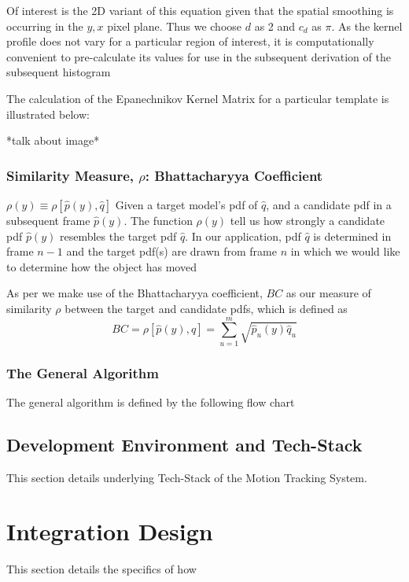 Of interest is the 2D variant of this equation given that the spatial smoothing
is occurring in the $y,x$ pixel plane. Thus we choose $d$ as 2 and $c_d$ as
$\pi$. As the kernel profile does not vary for a particular region of interest,
it is computationally convenient to pre-calculate its values for use in the subsequent derivation of the subsequent histogram

The calculation of the Epanechnikov Kernel Matrix for a particular template is
illustrated below:


*talk about image*


\subsubsection{Similarity Measure, $\rho$: Bhattacharyya Coefficient}

$\rho(y) \equiv \rho[\hat{p}(y),\hat{q}]$
Given a target model's pdf of $\hat{q}$, and a candidate pdf in a subsequent
frame $\hat{p}(y)$.  The function $\rho(y)$ tell us how strongly a candidate pdf
$\hat{p}(y)$ resembles the target pdf $\hat{q}$. In our application, pdf
$\hat{q}$ is determined in frame $n-1$ and the target pdf(s) are drawn from
frame $n$ in which we would like to determine how the object has moved

As per \cite{Comaniciu2003} we make use of the Bhattacharyya coefficient, $BC$ as our
measure of similarity $\rho$ between the target and candidate pdfs, which is
defined as
\begin{equation}
    BC = \rho[\hat{p}(y),\hat{q}]=\sum_{u=1}^{m}\sqrt{\hat{p}_u(y)\hat{q}_u}
\end{equation}



\subsubsection{The General Algorithm}
The general algorithm is defined by the following flow chart


\subsection{Development Environment and Tech-Stack}
This section details underlying Tech-Stack of the Motion Tracking System.

\section{Integration Design}
This section details the specifics of how 





